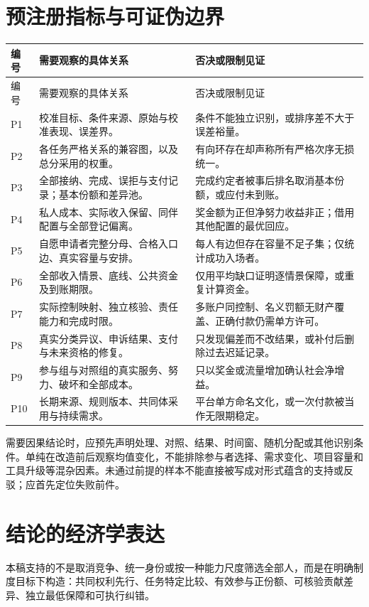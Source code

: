 \documentclass[12pt,a4paper,openany]{report}
\begin{document}
\begin{CJK*}{UTF8}{gkai}
\section{预注册指标与可证伪边界}
\begin{longtable}{L{0.08\textwidth}L{0.41\textwidth}L{0.42\textwidth}}
\toprule 编号 & 需要观察的具体关系 & 否决或限制见证\\\midrule\endfirsthead
\toprule 编号 & 需要观察的具体关系 & 否决或限制见证\\\midrule\endhead
P1 & 校准目标、条件来源、原始与校准表现、误差界。 & 条件不能独立识别，或排序差不大于误差裕量。\\
P2 & 各任务严格关系的兼容图，以及总分采用的权重。 & 有向环存在却声称所有严格次序无损统一。\\
P3 & 全部接纳、完成、误拒与支付记录；基本份额和差异池。 & 完成约定者被事后排名取消基本份额，或应付未到账。\\
P4 & 私人成本、实际收入保留、同伴配置与全部登记偏离。 & 奖金额为正但净努力收益非正；借用其他配置的最优回应。\\
P5 & 自愿申请者完整分母、合格入口边、真实容量与安排。 & 每人有边但存在容量不足子集；仅统计成功入场者。\\
P6 & 全部收入情景、底线、公共资金及到账期限。 & 仅用平均缺口证明逐情景保障，或重复计算资金。\\
P7 & 实际控制映射、独立核验、责任能力和完成时限。 & 多账户同控制、名义罚额无财产覆盖、正确付款仍需单方许可。\\
P8 & 真实分类异议、申诉结果、支付与未来资格的修复。 & 只发现偏差而不改结果，或补付后删除过去迟延记录。\\
P9 & 参与组与对照组的真实服务、努力、破坏和全部成本。 & 只以奖金或流量增加确认社会净增益。\\
P10 & 长期来源、规则版本、共同体采用与持续需求。 & 平台单方命名文化，或一次付款被当作无限期稳定。\\\bottomrule
\end{longtable}
需要因果结论时，应预先声明处理、对照、结果、时间窗、随机分配或其他识别条件。单纯在改造前后观察均值变化，不能排除参与者选择、需求变化、项目容量和工具升级等混杂因素。未通过前提的样本不能直接被写成对形式蕴含的支持或反驳；应首先定位失败前件。

\section{结论的经济学表达}
本稿支持的不是取消竞争、统一身份或按一种能力尺度筛选全部人，而是在明确制度目标下构造：共同权利先行、任务特定比较、有效参与正份额、可核验贡献差异、独立最低保障和可执行纠错。


\end{CJK*}
\end{document}
